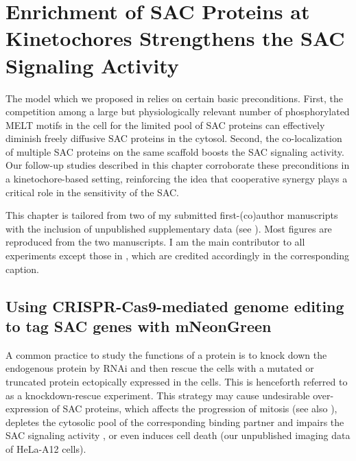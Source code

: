 \chapter{Enrichment of SAC Proteins at Kinetochores Strengthens the SAC Signaling Activity}
\label{chpt:3}

The model which we proposed in  relies on certain basic preconditions. First, the competition among a large but physiologically relevant number of phosphorylated MELT motifs in the cell for the limited pool of SAC proteins can effectively diminish freely diffusive SAC proteins in the cytosol. Second, the co-localization of multiple SAC proteins on the same  scaffold boosts the SAC signaling activity. Our follow-up studies described in this chapter corroborate these preconditions in a kinetochore-based setting, reinforcing the idea that cooperative synergy plays a critical role in the sensitivity of the SAC.

This chapter is tailored from two of my submitted first-(co)author manuscripts \cite{KImotifPaper, Paper3} with the inclusion of unpublished supplementary data (see ). Most figures are reproduced from the two manuscripts. I am the main contributor to all experiments except those in , which are credited accordingly in the corresponding caption.

\section{Using CRISPR-Cas9-mediated genome editing to tag SAC genes with mNeonGreen }
\label{TaggingSACProteins}

A common practice to study the functions of a protein is to knock down the endogenous protein by RNAi and then rescue the cells with a mutated or truncated protein ectopically expressed in the cells. This is henceforth referred to as a knockdown-rescue experiment.
This strategy may cause undesirable over-expression of SAC proteins, which affects the progression of mitosis \cite{Bub1Overexpression-AuroraBHyperactivation} (see also ), depletes the cytosolic pool of the corresponding binding partner and impairs the SAC signaling activity \cite{Bub3Competition, FissionYeastSACRobustness, ATMPhosphorylatesMad1S214, MAD1Overexpression_Ryan2012}, or even induces cell death (our unpublished imaging data of HeLa-A12 cells).

